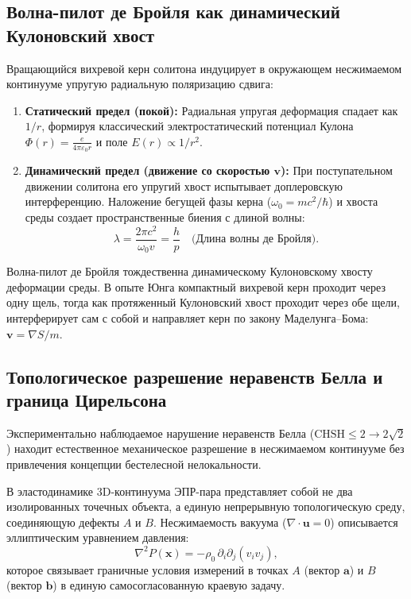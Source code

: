 \documentclass[12pt,a4paper]{article}
\begin{document}
	\subsection{Волна-пилот де Бройля как динамический Кулоновский хвост}
	Вращающийся вихревой керн солитона индуцирует в окружающем несжимаемом континууме упругую радиальную поляризацию сдвига:
	\begin{enumerate}
		\item \textbf{Статический предел (покой):} Радиальная упругая деформация спадает как $1/r$, формируя классический электростатический потенциал Кулона $\Phi(r) = \frac{e}{4\pi\varepsilon_0 r}$ и поле $E(r) \propto 1/r^2$.
		\item \textbf{Динамический предел (движение со скоростью $\mathbf{v}$):} При поступательном движении солитона его упругий хвост испытывает доплеровскую интерференцию. Наложение бегущей фазы керна ($\omega_0 = mc^2/\hbar$) и хвоста среды создает пространственные биения с длиной волны:
		\begin{equation}
			\lambda = \frac{2\pi c^2}{\omega_0 v} = \frac{h}{p} \quad \mathbf{\text{(Длина волны де Бройля)}}.
		\end{equation}
	\end{enumerate}
	Волна-пилот де Бройля тождественна динамическому Кулоновскому хвосту деформации среды. В опыте Юнга компактный вихревой керн проходит через одну щель, тогда как протяженный Кулоновский хвост проходит через обе щели, интерферирует сам с собой и направляет керн по закону Маделунга--Бома: $\mathbf{v} = \nabla S / m$.
	
	\subsection{Топологическое разрешение неравенств Белла и граница Цирельсона}
	
	Экспериментально наблюдаемое нарушение неравенств Белла ($\text{CHSH} \le 2 \to 2\sqrt{2}$) находит естественное механическое разрешение в несжимаемом континууме без привлечения концепции бестелесной нелокальности.
	
	В эластодинамике 3D-континуума ЭПР-пара представляет собой не два изолированных точечных объекта, а единую непрерывную топологическую среду, соединяющую дефекты $A$ и $B$. Несжимаемость вакуума ($\nabla \cdot \mathbf{u} = 0$) описывается эллиптическим уравнением давления:
	\begin{equation}
		\nabla^2 P(\mathbf{x}) = -\rho_0 \, \partial_i \partial_j \left( v_i v_j \right),
	\end{equation}
	которое связывает граничные условия измерений в точках $A$ (вектор $\mathbf{a}$) и $B$ (вектор $\mathbf{b}$) в единую самосогласованную краевую задачу.
	
\end{document}

